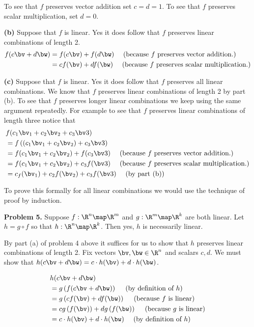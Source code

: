 \documentclass[oneside,12pt]{amsart}
\begin{document}
To see that $f$ preserves vector addition set $c=d=1$. To see that $f$
preserves scalar multiplication, set $d=0$.

\smallskip

\textbf{(b)} Suppose that $f$ is linear. Yes it does follow that $f$ preserves
linear combinations of length 2.
\begin{align*}
f(c\bv + d\bw) &= f(c\bv) + f(d\bw) \quad \text{ (because $f$ preserves vector addition.)} \\
               &= c f(\bv) + d f(\bw) \quad \text{ (because $f$ preserves scalar multiplication.)}
\end{align*}

\bigskip


\textbf{(c)} Suppose that $f$ is linear. Yes it does follow that $f$ preserves
all linear combinations. We know that $f$ preserves linear combinations of
length 2 by part (b). To see that $f$ preserves longer linear combinations
we keep using the same argument repeatedly. For example to see that $f$
preserves linear combinations of length three notice that
\begin{align*}
&f(c_1 \bv_1 + c_2 \bv_2 + c_3 \bv3) \\
&= f\left( (c_1 \bv_1 + c_2 \bv_2 )+ c_3 \bv3 \right) \\
&= f(c_1 \bv_1 + c_2 \bv_2) + f(c_3 \bv3) \quad \text{ (because $f$ preserves vector addition.)} \\
&= f(c_1 \bv_1 + c_2 \bv_2) + c_3f(\bv3) \quad \text{ (because $f$ preserves scalar multiplication.)} \\
&= c_f(\bv_1) + c_2 f(\bv_2) + c_3f(\bv3) \quad \text{ (by part (b))} \\
\end{align*}

To prove this formally for all linear combinations we would use the technique
of proof by induction.

\smallskip

\textbf{Problem 5.} Suppose $f:\R^n\map\R^m$ and $g:\R^m\map\R^k$ are both linear.
Let $h=g\circ f$ so that $h:\R^n\map\R^k$. Then yes, $h$ is necessarily linear.

By part (a) of problem 4 above it suffices for us to show that $h$ preserves
linear combinations of length 2. Fix vectors $\bv, \bw \in \R^n$ and scalars
$c,d$. We must show that $h(c\bv +d \bw) = c \cdot h(\bv) + d \cdot h(\bw)$.

\begin{align*}
&h(c\bv +d \bw) \\
&= g\left( f(c\bv +d \bw) \right)  \quad \text{ (by definition of $h$)} \\
&= g\left( cf(\bv) +df(\bw) \right)  \quad \text{ (because $f$ is linear)} \\
&= c g\left( f(\bv) \right) +d g \left(f(\bw) \right)  \quad \text{ (because $g$ is linear)} \\
& = c \cdot h(\bv) + d \cdot h(\bw) \quad \text{ (by definition of $h$)}
\end{align*}
\end{document}
